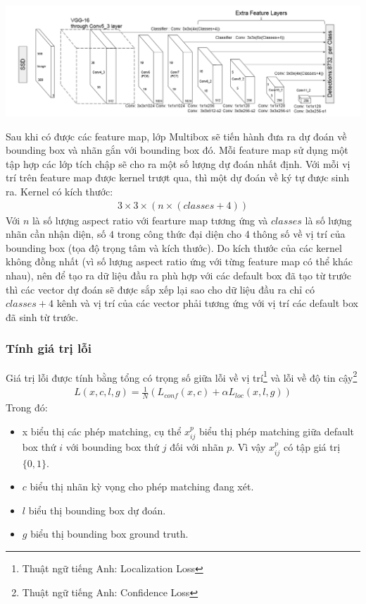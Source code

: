 \documentclass[a4paper,12pt]{article}
\begin{document}
	\begin{center}
		
		\centering
		\includegraphics[width=0.8\linewidth]{SSD_Struture.png}
		\vspace{0.5cm}
	\end{center}
	Sau khi có được các feature map, lớp Multibox sẽ tiến hành đưa ra dự đoán về bounding box và nhãn gắn với bounding box đó. Mỗi feature map sử dụng một tập hợp các lớp tích chập sẽ cho ra một số lượng dự đoán nhất định. Với mỗi vị trí trên feature map được kernel trượt qua, thì một dự đoán về ký tự được sinh ra. Kernel có kích thước:
	\begin{align}
	3 \times 3 \times (n \times (classes + 4))
	\end{align}
	Với $n$ là số lượng aspect ratio với fearture map tương ứng và $classes$ là số lượng nhãn cần nhận diện, số $4$ trong công thức đại diện cho 4 thông số về vị trí của bounding box (tọa độ trọng tâm và kích thước). Do kích thước của các kernel không đồng nhất (vì số lượng aspect ratio ứng với từng feature map có thể khác nhau), nên để tạo ra dữ liệu đầu ra phù hợp với các default box đã tạo từ trước thì các vector dự đoán sẽ được sắp xếp lại sao cho dữ liệu đầu ra chỉ có $classes + 4$ kênh và vị trí của các vector phải tương ứng với vị trí các default box đã sinh từ trước.
	
	\subsubsection{Tính giá trị lỗi}
	
	Giá trị lỗi được tính bằng tổng có trọng số giữa lỗi về vị trí\footnote{Thuật ngữ tiếng Anh: Localization Loss} và lỗi về độ tin cậy\footnote{Thuật ngữ tiếng Anh: Confidence Loss}
	\begin{align}
	L(x,c,l,g) = \frac{1}{N} (L_{conf}(x,c) + \alpha L_{loc}(x,l,g) )
	\end{align}
	Trong đó:
	\begin{itemize}
		\item x biểu thị các phép matching, cụ thể $x^p_{ij}$ biểu thị phép matching giữa default box thứ $i$ với bounding box thứ $j$ đối với nhãn $p$. Vì vậy $x^p_{ij}$ có tập giá trị $\{0, 1\}$.
		\item $c$ biểu thị nhãn kỳ vọng cho phép matching đang xét.
		\item $l$ biểu thị bounding box dự đoán.
		\item $g$ biểu thị bounding box ground truth.
	\end{itemize}
	
\end{document}

